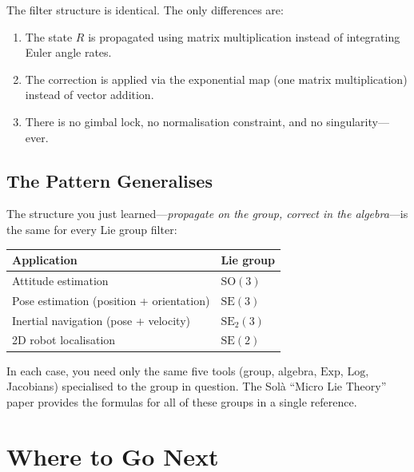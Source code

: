 \documentclass[11pt,letterpaper]{article}
\newcommand{\SO}{\mathrm{SO}(3)}
\newcommand{\expmap}{\mathrm{Exp}}
\newcommand{\logmap}{\mathrm{Log}}
\begin{document}
The filter structure is identical.  The only differences are:
\begin{enumerate}[nosep]
  \item The state $R$ is propagated using matrix multiplication
    instead of integrating Euler angle rates.
  \item The correction is applied via the exponential map (one
    matrix multiplication) instead of vector addition.
  \item There is no gimbal lock, no normalisation constraint, and
    no singularity---ever.
\end{enumerate}

\subsection{The Pattern Generalises}

The structure you just learned---\emph{propagate on the group,
correct in the algebra}---is the same for every Lie group filter:

\begin{center}
\begin{tabular}{ll}
\toprule
\textbf{Application} & \textbf{Lie group} \\
\midrule
Attitude estimation & $\SO$ \\
Pose estimation (position + orientation) & $\mathrm{SE}(3)$ \\
Inertial navigation (pose + velocity) & $\mathrm{SE}_{2}(3)$ \\
2D robot localisation & $\mathrm{SE}(2)$ \\
\bottomrule
\end{tabular}
\end{center}

In each case, you need only the same five tools (group, algebra,
$\expmap$, $\logmap$, Jacobians) specialised to the group in
question.  The Sol\`{a} ``Micro Lie Theory'' paper provides the
formulas for all of these groups in a single reference.

\newpage
\section{Where to Go Next}
\end{document}
